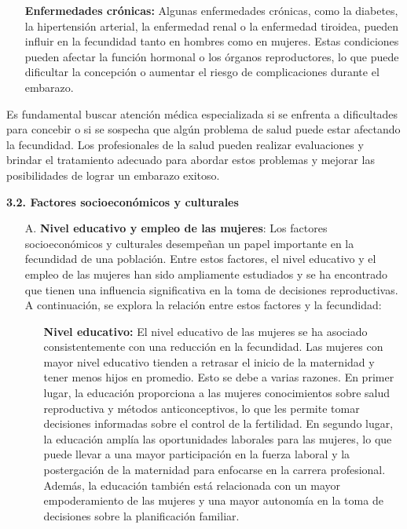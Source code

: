\documentclass[8pt,a4paper]{beamer}
\begin{document}
{\begin{frame}{}
\begin{block}{}
\begin{enumerate}
\begin{enumerate}
\item[\ding{65}] \textbf{Enfermedades crónicas:} Algunas enfermedades crónicas, como la diabetes, la hipertensión arterial, la enfermedad renal o la enfermedad tiroidea, pueden influir en la fecundidad tanto en hombres como en mujeres. Estas condiciones pueden afectar la función hormonal o los órganos reproductores, lo que puede dificultar la concepción o aumentar el riesgo de complicaciones durante el embarazo.
\end{enumerate}
Es fundamental buscar atención médica especializada si se enfrenta a dificultades para concebir o si se sospecha que algún problema de salud puede estar afectando la fecundidad. Los profesionales de la salud pueden realizar evaluaciones y brindar el tratamiento adecuado para abordar estos problemas y mejorar las posibilidades de lograr un embarazo exitoso.
\end{enumerate}
\end{block}
\end{frame}


\begin{frame}{}
\begin{block}{\textbf{3.2. Factores socioeconómicos y culturales}}
\justifying
\begin{enumerate}
\setlength{\parskip}{3px}
\justifying
\item[A.] \textbf{Nivel educativo y empleo de las mujeres}: Los factores socioeconómicos y culturales desempeñan un papel importante en la fecundidad de una población. Entre estos factores, el nivel educativo y el empleo de las mujeres han sido ampliamente estudiados y se ha encontrado que tienen una influencia significativa en la toma de decisiones reproductivas. A continuación, se explora la relación entre estos factores y la fecundidad:
\begin{enumerate}
\setlength{\parskip}{3px}
\justifying
\item[\ding{65}] \textbf{Nivel educativo:} El nivel educativo de las mujeres se ha asociado consistentemente con una reducción en la fecundidad. Las mujeres con mayor nivel educativo tienden a retrasar el inicio de la maternidad y tener menos hijos en promedio. Esto se debe a varias razones. En primer lugar, la educación proporciona a las mujeres conocimientos sobre salud reproductiva y métodos anticonceptivos, lo que les permite tomar decisiones informadas sobre el control de la fertilidad. En segundo lugar, la educación amplía las oportunidades laborales para las mujeres, lo que puede llevar a una mayor participación en la fuerza laboral y la postergación de la maternidad para enfocarse en la carrera profesional. Además, la educación también está relacionada con un mayor empoderamiento de las mujeres y una mayor autonomía en la toma de decisiones sobre la planificación familiar.


\end{enumerate}
\end{enumerate}
\end{block}
\end{frame}}
\end{document}
